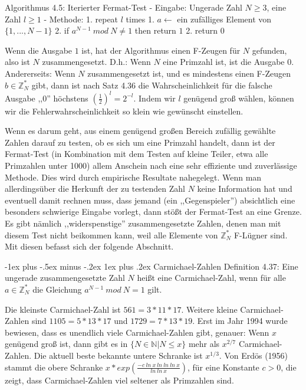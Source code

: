 \documentclass[a4paper]{article}
\makeatletter
\renewcommand{\subsubsection}{\@startsection{subsubsection}{3}{0mm}%
 {-1ex plus -.5ex minus -.2ex}%
 {1ex plus .2ex}%
 {\normalfont\small\bfseries}}
\makeatother
\begin{document}
\begin{multicols}{3}
        Algorithmus 4.5: Iterierter Fermat-Test
        - Eingabe: Ungerade Zahl $N\geq 3$, eine Zahl $l\geq 1$
        - Methode:
        1. repeat $l$ times
        1. $a\leftarrow$ ein zufälliges Element von $\{1 ,...,N-1\}$
        2. if $a^{N-1}\ mod\ N\not= 1$ then return $1$
        2. return 0

        Wenn die Ausgabe $1$ ist, hat der Algorithmus einen F-Zeugen für $N$ gefunden, also ist $N$ zusammengesetzt. D.h.: Wenn $N$ eine Primzahl ist, ist die Ausgabe $0$. Andererseits: Wenn $N$ zusammengesetzt ist, und es mindestens einen F-Zeugen $b\in\mathbb{Z}^*_N$ gibt, dann ist nach Satz 4.36 die Wahrscheinlichkeit für die falsche Ausgabe ,,0'' höchstens $(\frac{1}{2})^l= 2^{-l}$. Indem wir $l$ genügend groß wählen, können wir die Fehlerwahrscheinlichkeit so klein wie gewünscht einstellen.

        Wenn es darum geht, aus einem genügend großen Bereich zufällig gewählte Zahlen darauf zu testen, ob es sich um eine Primzahl handelt, dann ist der Fermat-Test (in Kombination mit dem Testen auf kleine Teiler, etwa alle Primzahlen unter 1000) allem Anschein nach eine sehr effiziente und zuverlässige Methode. Dies wird durch empirische Resultate nahegelegt. Wenn man allerdingsüber die Herkunft der zu testenden Zahl $N$ keine Information hat und eventuell damit rechnen muss, dass jemand (ein ,,Gegenspieler'') absichtlich eine besonders schwierige Eingabe vorlegt, dann stößt der Fermat-Test an eine Grenze. Es gibt nämlich ,,widerspenstige'' zusammengesetzte Zahlen, denen man mit diesem Test nicht beikommen kann, weil alle Elemente von $\mathbb{Z}^*_N$ F-Lügner sind. Mit diesen befasst sich der folgende Abschnitt.

        \subsubsection{Carmichael-Zahlen}
        Definition 4.37: Eine ungerade zusammengesetzte Zahl $N$ heißt eine Carmichael-Zahl, wenn für alle $a\in\mathbb{Z}^*_N$ die Gleichung $a^{N-1}\ mod\ N= 1$ gilt.

        Die kleinste Carmichael-Zahl ist $561 = 3* 11 *17$. Weitere kleine Carmichael-Zahlen sind $1105 = 5* 13 *17$ und $1729 = 7* 13 *19$. Erst im Jahr 1994 wurde bewiesen, dass es unendlich viele Carmichael-Zahlen gibt, genauer: Wenn $x$ genügend groß ist, dann gibt es in $\{N\in\mathbb{N}| N\leq x\}$ mehr als $x^{2/7}$ Carmichael-Zahlen. Die aktuell beste bekannte untere Schranke ist $x^{1/3}$. Von Erdös (1956) stammt die obere Schranke $x*exp(\frac{-c\ ln\ x\ ln\ ln\ ln\ x}{ln\ ln\ x})$, für eine Konstante $c>0$, die zeigt, dass Carmichael-Zahlen viel seltener als Primzahlen sind.


\end{multicols}
\end{document}
